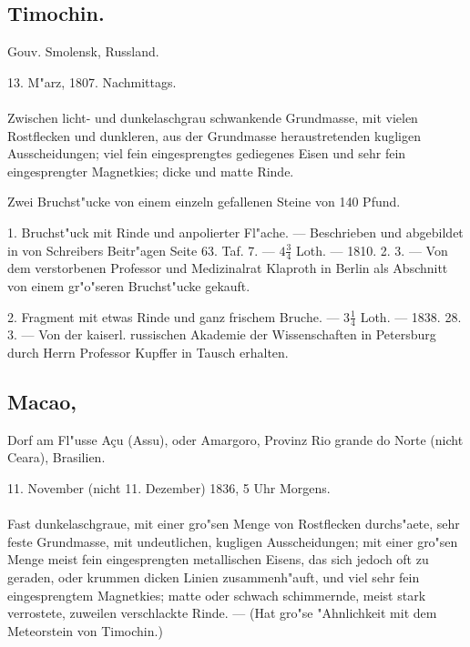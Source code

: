 \documentclass[a4paper, 11pt, oneside, polutonikogreek, german]{article}
\begin{document}
\subsection{Timochin.}
\begin{center}
\small
Gouv. Smolensk, Russland.

13. M"arz, 1807. Nachmittags.
\end{center}
\paragraph{}
Zwischen licht- und dunkelaschgrau schwankende Grundmasse, mit vielen Rostflecken und dunkleren, aus der Grundmasse heraustretenden kugligen Ausscheidungen; viel fein eingesprengtes gediegenes Eisen und sehr fein eingesprengter Magnetkies; dicke und matte Rinde.

Zwei Bruchst"ucke von einem einzeln gefallenen Steine von 140 Pfund.

1. Bruchst"uck mit Rinde und anpolierter Fl"ache. --- Beschrieben und abgebildet in von Schreibers Beitr"agen Seite 63. Taf. 7. --- $4\frac{3}{4}$ Loth. --- 1810. 2. 3. --- Von dem verstorbenen Professor und Medizinalrat Klaproth in Berlin als Abschnitt von einem gr"o"seren Bruchst"ucke gekauft.

2. Fragment mit etwas Rinde und ganz frischem Bruche. --- $3\frac{1}{4}$ Loth. --- 1838. 28. 3. --- Von der kaiserl. russischen Akademie der Wissenschaften in Petersburg durch Herrn Professor Kupffer in Tausch erhalten.
\subsection[Macao.]{Macao,}
\begin{center}
\small
Dorf am Fl"usse Açu (Assu), oder Amargoro, Provinz Rio grande do Norte (nicht Ceara), Brasilien.

11. November (nicht 11. Dezember) 1836, 5 Uhr Morgens.
\end{center}
\paragraph{}
Fast dunkelaschgraue, mit einer gro"sen Menge von Rostflecken durchs"aete, sehr feste Grundmasse, mit undeutlichen, kugligen Ausscheidungen; mit einer gro"sen Menge meist fein eingesprengten metallischen Eisens, das sich jedoch oft zu geraden, oder krummen dicken Linien zusammenh"auft, und viel sehr fein eingesprengtem Magnetkies; matte oder schwach schimmernde, meist stark verrostete, zuweilen verschlackte Rinde. --- (Hat gro"se "Ahnlichkeit mit dem Meteorstein von Timochin.)
\end{document}
